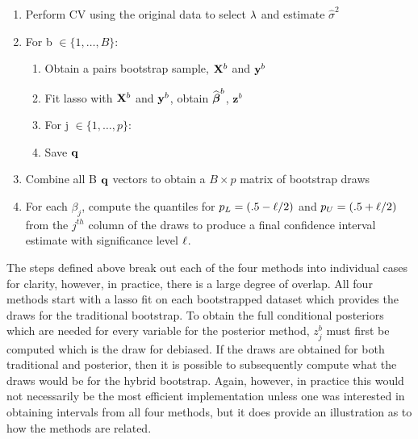 \begin{enumerate}
\item Perform CV using the original data to select $\lambda$ and estimate $\hat{\sigma}^2$
\item For b $\in \lbrace 1, \ldots, B \rbrace$:
\begin{enumerate}
\item Obtain a pairs bootstrap sample, $\mathbf{X}^b$ and $\mathbf{y}^b$
\item Fit lasso with $\mathbf{X}^b$ and $\mathbf{y}^b$, obtain $\widehat{\boldsymbol{\beta}}^b$, $\boldsymbol{z}^b$
\item For j $\in \lbrace 1, \ldots, p \rbrace$:
	\begin{algorithmic}
    \EndCase
    \EndCase
    \EndCase
    \EndCase
	\EndSwitch 
	\end{algorithmic}
\item Save $\mathbf{q}$
\end{enumerate}
\item Combine all B $\mathbf{q}$ vectors to obtain a $B \times p$ matrix of bootstrap draws 
\item For each $\beta_j$, compute the quantiles for $p_L = (.5 - \ell/2)$ and $p_U = (.5 + \ell/2)$ from the $j^{th}$ column of the draws to produce a final confidence interval estimate with significance level $\ell$.
\end{enumerate}


The steps defined above break out each of the four methods into individual cases for clarity, however, in practice, there is a large degree of overlap. All four methods start with a lasso fit on each bootstrapped dataset which provides the draws for the traditional bootstrap. To obtain the full conditional posteriors which are needed for every variable for the posterior method, $z^b_j$ must first be computed which is the draw for debiased. If the draws are obtained for both traditional and posterior, then it is possible to subsequently compute what the draws would be for the hybrid bootstrap. Again, however, in practice this would not necessarily be the most efficient implementation unless one was interested in obtaining intervals from all four methods, but it does provide an illustration as to how the methods are related.

